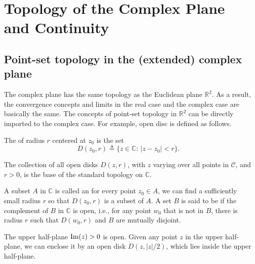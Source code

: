 

\chapter{Topology of the Complex Plane and Continuity}



\section{Point-set topology in the (extended) complex plane}


The complex plane has the same topology as the Euclidean plane $\mathbb{R}^2$.  As a result, the convergence concepts and limits in the real case and the complex case are basically the same. The concepts of point-set topology in $\mathbb{R}^2$ can be directly imported to the complex case.
For example, open disc is defined as follows.
\begin{svgraybox}
	\begin{definition} 
		The  of radius $r$ centered at $z_0$ is the set
		$$
		D(z_0,r) \triangleq \{z\in\mathbb{C}:\, |z-z_0|<r\}.
		$$
	\end{definition}
\end{svgraybox}

The collection of all open disks $D(z,r)$, with $z$ varying over all points in $\mathcal{C}$, and $r>0$, is the base of the standard topology on $\mathbb{C}$.

\begin{svgraybox}
	\begin{definition}  \label{def:open_set}
		A subset $A$ in $\mathbb{C}$  is called an  for every point $z_0\in A$, we can find a sufficiently small radius $r$ so that $D(z_0,r)$ is a subset of $A$. A set $B$ is said to be  if the complement of $B$ in $\mathbb{C}$ is open, i.e., for any point $w_0$ that is not in $B$, there is radius $r$ such that $D(w_0,r)$ and $B$ are mutually disjoint.
	\end{definition}
\end{svgraybox}

\begin{example}
	The upper half-plane $\operatorname{\mathrm{Im}}(z) >0$ is open. Given any point $z$ in the upper half-plane, we can enclose it by an open disk $D(z, |z|/2)$, which lies inside the upper half-plane. 
\end{example}

